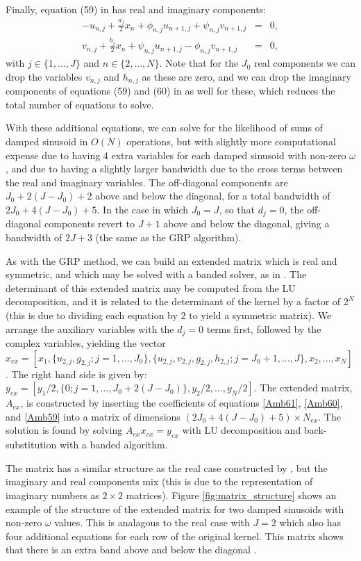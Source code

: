 \documentclass[manuscript, letterpaper]{aastex6}
\begin{document}
Finally, equation (59) in \citet{Ambikasaran:2015} has real and imaginary components:
\begin{eqnarray} \label{Amb59}
-u_{n,j} + \frac{a_j}{2} x_n + \phi_{n,j} u_{n+1,j} + \psi_{n,j} v_{n+1,j} &=&0,\\
 v_{n,j} + \frac{b_j}{2} x_n + \psi_{n,j} u_{n+1,j} - \phi_{n,j} v_{n+1,j} &=&0,
\end{eqnarray}
with $j \in \{1,...,J\}$ and $n \in \{2,...,N\}$.  Note that for the $J_0$ real components
we can drop the variables $v_{n,j}$ and $h_{n,j}$ as these are zero, and we can drop the
imaginary components of equations (59) and (60) in \citet{Ambikasaran:2015} as well for these, which reduces the total number
of equations to solve.

With these additional equations, we can solve for the likelihood of sums of damped sinusoid
in $O(N)$ operations, but with slightly more computational expense due to having 4 extra variables
for each damped sinusoid with non-zero $\omega$, and due to having a slightly larger bandwidth due to the
cross terms between the real and imaginary variables.  The off-diagonal components are $J_0+2(J-J_0)+2$ above
and below the diagonal, for a total bandwidth of $2J_0+4(J-J_0)+5$. In the case in which $J_0=J$, so
that $d_j=0$, the off-diagonal components revert to $J+1$
above and below the diagonal, giving a bandwidth of $2J+3$ (the same as the GRP algorithm).

As with the GRP method, we can build an extended matrix which is real and symmetric, and which may be
solved with a banded solver, as in \citet{Press:1992}.  The determinant of this extended matrix
may be computed from the LU decomposition, and it is related to the determinant of the kernel by a
factor of $2^N$ (this is due to dividing each equation by $2$ to yield a symmetric matrix).
We arrange the auxiliary variables with the $d_j=0$
terms first, followed by the complex variables, yielding the vector
$x_{ex} = [x_1, \{u_{2,j},g_{2,j};j=1,...,J_0\}, \{u_{2,j},v_{2,j},g_{2,j},h_{2,j};j=J_0+1,...,J\},
x_2, ..., x_N]$.  The right hand side is given by: $y_{ex} = [y_1/2, \{0; j=1,...,J_0+2(J-J_0)\}, y_2/2, ..., y_N/2]$.
The extended matrix, $A_{ex}$, is constructed by inserting the coefficients of equations \ref{Amb61},
\ref{Amb60}, and \ref{Amb59} into a matrix of dimensions $(2J_0+4(J-J_0)+5) \times N_{ex}$.
The solution is found by solving $A_{ex} x_{ex} = y_{ex}$ with LU decomposition and back-substitution
with a banded algorithm.

The matrix has a similar structure as the real case constructed by \citep{Ambikasaran:2015}, but the
imaginary and real components mix (this is due to the representation of imaginary numbers as
$2\times 2$ matrices).  Figure \ref{fig:matrix_structure} shows an example of the structure of the extended
matrix for two damped sinusoids with non-zero $\omega$ values.  This is analagous to the real case with
$J=2$ which also has four additional equations for each row of the original kernel.  This matrix shows
that there is an extra band above and below the diagonal \citep[compare with Figure 2 of][]{Ambikasaran:2015}.
\end{document}
